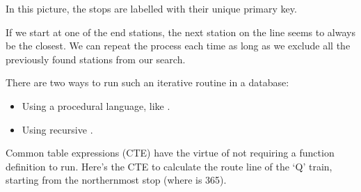 \documentclass[a4paper,11pt,english]{sphinxmanual}
\let\sphinxpxdimen\pdfpxdimen\else\newdimen\sphinxpxdimen
\begin{document}
In this picture, the stops are labelled with their unique  primary key.

\noindent\sphinxincludegraphics[height=700\sphinxpxdimen]{{adv_geom01}.png}

If we start at one of the end stations, the next station on the line seems to always be the closest. We can repeat the process each time as long as we exclude all the previously found stations from our search.

There are two ways to run such an iterative routine in a database:
\begin{itemize}
\item {} 
Using a procedural language, like .

\item {} 
Using recursive .

\end{itemize}

Common table expressions (CTE) have the virtue of not requiring a function definition to run. Here’s the CTE to calculate the route line of the ‘Q’ train, starting from the northernmost stop (where  is 365).

\begin{sphinxVerbatim}[commandchars=\\\{\}]
     
      \PYG{p}{[}\PYG{p}{]}  
     
       
     
         
        
        
        \PYG{p}{[}\PYG{p}{]}
        
     
    
\end{sphinxVerbatim}
\end{document}
